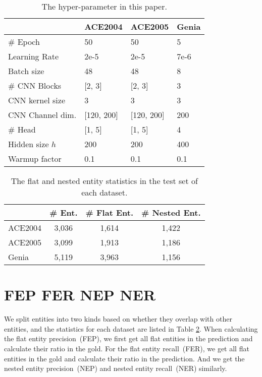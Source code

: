 \documentclass[11pt]{article}
\begin{document}
\begin{table}[!h]
  \centering
  \small
  \setlength{\tabcolsep}{3pt}
  \begin{tabular}{@{}llll@{}}
    \toprule
                   & ACE2004        & ACE2005        & Genia \\
                   \midrule
  \# Epoch         & 50             & 50             & 5     \\
  Learning Rate    & 2e-5           & 2e-5           & 7e-6  \\
  Batch size       & 48             & 48             & 8     \\
  \# CNN Blocks    & [2, 3]     & [2, 3]     & 3     \\
  CNN kernel size  & 3              & 3              & 3     \\
  CNN Channel dim. & [120, 200] & [120, 200] & 200   \\
  \# Head          & [1, 5]              & [1, 5]              & 4     \\
  Hidden size $h$  & 200            & 200            & 400   \\
  Warmup factor    & 0.1            & 0.1            & 0.1   \\
  \bottomrule
  \end{tabular}
  \caption{The hyper-parameter in this paper.}
  \label{tab:hyper}
  \end{table}



\begin{table}[!h]
  \centering
  \small
  \begin{tabular}{@{}lccc@{}}
    \toprule
          & \# Ent. & \# Flat Ent. & \# Nested Ent. \\
          \midrule
  ACE2004 &   3,036  &  1,614  &  1,422   \\
  ACE2005 &   3,099  &  1,913  &  1,186            \\
  Genia   &   5,119  &  3,963  &  1,156         \\
  \bottomrule            
  \end{tabular}
  \caption{The flat and nested entity statistics in the test set of each dataset. } \label{tab:why_stat}
\end{table}

\section{FEP FER NEP NER}
We split entities into two kinds based on whether they overlap with other entities, and the statistics for each dataset are listed in Table \ref{tab:why_stat}. When calculating the flat entity precision~(FEP), we first get all flat entities in the prediction and calculate their ratio in the gold. For the flat entity recall~(FER), we get all flat entities in the gold and calculate their ratio in the prediction. And we get the nested entity precision~(NEP) and nested entity recall~(NER) similarly.
\end{document}
